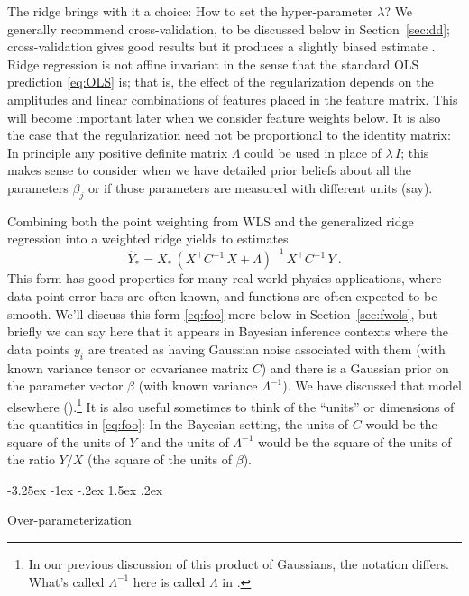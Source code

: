 \documentclass[12pt,letterpaper]{article}
\makeatletter
\renewcommand\section{\@startsection {section}{1}{\z@}%
  {-3.25ex \@plus -1ex \@minus -.2ex}%
  {1.5ex \@plus .2ex}%
  {\raggedright\normalfont\large\bfseries}}
\newcommand{\sectionname}{Section}
\makeatother
\begin{document}
The ridge brings with it a choice: How to set the hyper-parameter $\lambda$?
We generally recommend cross-validation, to be discussed below in \sectionname~\ref{sec:dd}; cross-validation gives good results but it produces a slightly biased estimate \citep{cv-bias}.
Ridge regression is not affine invariant in the sense that the standard OLS prediction \eqref{eq:OLS} is; that is, the effect of the regularization depends on the amplitudes and linear combinations of features placed in the feature matrix.
This will become important later when we consider feature weights below.
It is also the case that the regularization need not be proportional to the identity matrix: In principle any positive definite matrix $\Lambda$ could be used in place of $\lambda\,I$; this makes sense to consider when we have detailed prior beliefs about all the parameters $\beta_j$ or if those parameters are measured with different units (say).

Combining both the point weighting from WLS and the generalized ridge regression into a weighted ridge yields to estimates
\begin{equation}\label{eq:foo}
    \hat{Y}_\ast = X_\ast\,(X^\top C^{-1}\,X + \Lambda)^{-1}\,X^\top C^{-1}\,Y
    ~.
\end{equation}
This form has good properties for many real-world physics applications, where data-point error bars are often known, and functions are often expected to be smooth.
We'll discuss this form \eqref{eq:foo} more below in \sectionname~\ref{sec:fwols},
but briefly we can say here that it appears in Bayesian inference contexts where the data points $y_i$ are treated as having Gaussian noise associated with them (with known variance tensor or covariance matrix $C$) and there is a Gaussian prior on the parameter vector $\beta$ (with known variance $\Lambda^{-1}$).
We have discussed that model elsewhere (\citealt{products}).\footnote{In our previous discussion of this product of Gaussians, the notation differs. What's called $\Lambda^{-1}$ here is called $\Lambda$ in \citet{products}.}
It is also useful sometimes to think of the ``units'' or dimensions of the quantities in \eqref{eq:foo}: In the Bayesian setting, the units of $C$ would be the square of the units of $Y$ and the units of $\Lambda^{-1}$ would be the square of the units of the ratio $Y/X$ (the square of the units of $\beta$).

\section{Over-parameterization}\label{sec:overpar}
\end{document}
